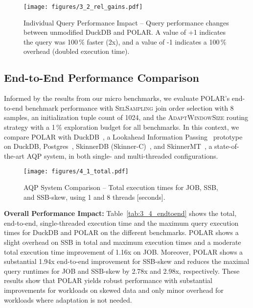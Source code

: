 \begin{figure*}[!t]
    \centering
    \texttt{[image: figures/3\_2\_rel\_gains.pdf]}
    \vspace{-0.25cm}
    \caption{Individual Query Performance Impact -- Query performance changes between unmodified DuckDB and POLAR. A value of +1 indicates the query was 100\,\% faster (2x), and a value of -1 indicates a 100\,\% overhead (doubled execution time).}
    \label{fig:3_2_rel_gains}
		\vspace{-0.1cm}
\end{figure*}

\subsection{End-to-End Performance Comparison}
\label{sec:end-to-end}

Informed by the results from our micro benchmarks, we evaluate POLAR's end-to-end benchmark performance with \textsc{SelSampling} join order selection with 8 samples, an initialization tuple count of 1024, and the \textsc{AdaptWindowSize} routing strategy with a 1\,\% exploration budget for all benchmarks. In this context, we compare POLAR with DuckDB~\cite{RaasveldtM19}, a Lookahead Information Passing~\cite{ZhuPSP17} prototype on DuckDB, Postgres~\cite{DBLP:conf/sigmod/StonebrakerR86}, SkinnerDB (\ie Skinner-C)~\cite{TrummerWMMJA19}, and SkinnerMT~\cite{WeiT22}, a state-of-the-art AQP system, in both single- and multi-threaded configurations.



\begin{figure*}
    \centering
    \texttt{[image: figures/4\_1\_total.pdf]}
    \vspace{-0.25cm}
    \caption{AQP System Comparison -- Total execution times for JOB, SSB, and SSB-skew, using 1 and 8 threads [seconds].}
    \label{fig:4_1_total}
		\vspace{-0.1cm}
\end{figure*}

\textbf{Overall Performance Impact:} Table~\ref{tab:3_4_endtoend} shows the total, end-to-end, single-threaded execution time and the maximum query execution times for DuckDB and POLAR on the different benchmarks. POLAR shows a slight overhead on SSB in total and maximum execution times and a moderate total execution time improvement of 1.16x on JOB. Moreover, POLAR shows a substantial 1.94x end-to-end improvement for SSB-skew and reduces the maximal query runtimes for JOB and SSB-skew by 2.78x and 2.98x, respectively. These results show that POLAR yields robust performance with substantial improvements for workloads on skewed data and only minor overhead for workloads where adaptation is not needed.

